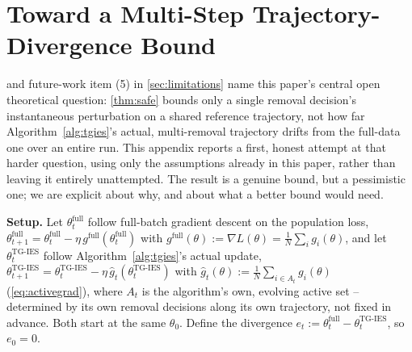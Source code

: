 \documentclass{article}
\theoremstyle{plain}
\theoremstyle{definition}
\theoremstyle{remark}
\begin{document}
\section{Toward a Multi-Step Trajectory-Divergence Bound}
\label{app:multistep}

 and future-work item (5) in \cref{sec:limitations} name this paper's central open theoretical question: \cref{thm:safe} bounds only a single removal decision's instantaneous perturbation on a shared reference trajectory, not how far Algorithm~\ref{alg:tgies}'s actual, multi-removal trajectory drifts from the full-data one over an entire run. This appendix reports a first, honest attempt at that harder question, using only the assumptions already in this paper, rather than leaving it entirely unattempted. The result is a genuine bound, but a pessimistic one; we are explicit about why, and about what a better bound would need.

\textbf{Setup.} Let $\theta_t^{\mathrm{full}}$ follow full-batch gradient descent on the population loss, $\theta_{t+1}^{\mathrm{full}} = \theta_t^{\mathrm{full}} - \eta\, g^{\mathrm{full}}(\theta_t^{\mathrm{full}})$ with $g^{\mathrm{full}}(\theta) := \nabla L(\theta) = \frac1N\sum_i g_i(\theta)$, and let $\theta_t^{\mathrm{TG\text{-}IES}}$ follow Algorithm~\ref{alg:tgies}'s actual update, $\theta_{t+1}^{\mathrm{TG\text{-}IES}} = \theta_t^{\mathrm{TG\text{-}IES}} - \eta\, \hat g_t(\theta_t^{\mathrm{TG\text{-}IES}})$ with $\hat g_t(\theta) := \frac1N\sum_{i\in A_t}g_i(\theta)$ (\cref{eq:activegrad}), where $A_t$ is the algorithm's own, evolving active set -- determined by its own removal decisions along its own trajectory, not fixed in advance. Both start at the same $\theta_0$. Define the divergence $e_t := \theta_t^{\mathrm{full}} - \theta_t^{\mathrm{TG\text{-}IES}}$, so $e_0=0$.
\end{document}
